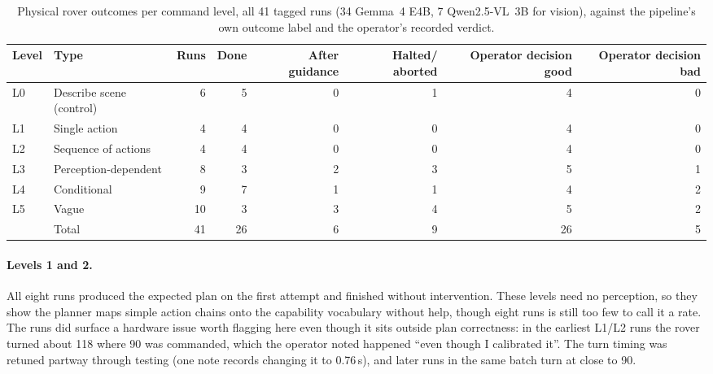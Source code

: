 \begin{table}[htbp]
    \centering
    \caption{Physical rover outcomes per command level, all 41 tagged runs (34 Gemma~4 E4B, 7 Qwen2.5-VL~3B for vision), against the pipeline's own outcome label and the operator's recorded verdict.}
    \label{tab:rq1_levels}
    \small
    \setlength{\tabcolsep}{4.5pt}
    \begin{tabular}{lp{2.9cm}rrrrrr}
        \toprule
        Level & Type & Runs & Done & After guidance & Halted/ aborted & Operator decision good & Operator decision bad \\
        \midrule
        L0 & Describe scene (control) & 6 & 5 & 0 & 1 & 4 & 0 \\
        L1 & Single action & 4 & 4 & 0 & 0 & 4 & 0 \\
        L2 & Sequence of actions & 4 & 4 & 0 & 0 & 4 & 0 \\
        L3 & Perception-dependent & 8 & 3 & 2 & 3 & 5 & 1 \\
        L4 & Conditional & 9 & 7 & 1 & 1 & 4 & 2 \\
        L5 & Vague & 10 & 3 & 3 & 4 & 5 & 2 \\
        \midrule
        & Total & 41 & 26 & 6 & 9 & 26 & 5 \\
        \bottomrule
    \end{tabular}
\end{table}

\paragraph{Levels 1 and 2.} All eight runs produced the expected plan on the first attempt and finished without
intervention. These levels need no perception, so they show the planner maps simple action chains onto the
capability vocabulary without help, though eight runs is still too few to call it a rate. The runs did surface a
hardware issue worth flagging here even though it sits outside plan correctness: in the earliest L1/L2 runs the
rover turned about 118\textdegree{} where 90\textdegree{} was commanded, which the operator noted happened ``even
though I calibrated it''. The turn timing was retuned partway through testing (one note records changing it to
0.76\,s), and later runs in the same batch turn at close to 90\textdegree{}. 

